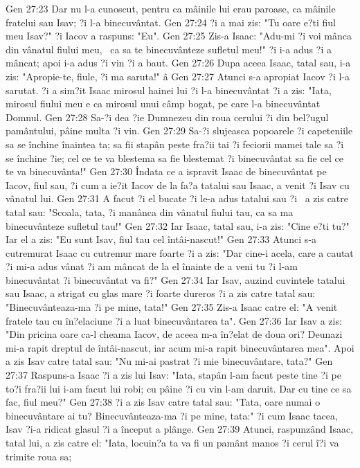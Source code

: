 Gen 27:23  Dar nu l-a cunoscut, pentru ca mâinile lui erau paroase, ca mâinile fratelui sau Isav; ?i l-a binecuvântat.
Gen 27:24  ?i a mai zis: "Tu oare e?ti fiul meu Isav?" ?i Iacov a raspuns: "Eu".
Gen 27:25  Zis-a Isaac: "Adu-mi ?i voi mânca din vânatul fiului meu,  ca sa te binecuvânteze sufletul meu!" ?i i-a adus ?i a mâncat; apoi i-a adus ?i vin ?i a baut.
Gen 27:26  Dupa aceea Isaac, tatal sau, i-a zis: "Apropie-te, fiule, ?i ma saruta!" â
Gen 27:27  Atunci s-a apropiat Iacov ?i l-a sarutat. ?i a sim?it Isaac mirosul hainei lui ?i l-a binecuvântat ?i a zis: "Iata, mirosul fiului meu e ca mirosul unui câmp bogat, pe care l-a binecuvântat Domnul.
Gen 27:28  Sa-?i dea ?ie Dumnezeu din roua cerului ?i din bel?ugul pamântului, pâine multa ?i vin.
Gen 27:29  Sa-?i slujeasca popoarele ?i capeteniile sa se închine înaintea ta; sa fii stapân peste fra?ii tai ?i feciorii mamei tale sa ?i se închine ?ie; cel ce te va blestema sa fie blestemat ?i binecuvântat sa fie cel ce te va binecuvânta!"
Gen 27:30  Îndata ce a ispravit Isaac de binecuvântat pe Iacov, fiul sau, ?i cum a ie?it Iacov de la fa?a tatalui sau Isaac, a venit ?i Isav cu vânatul lui.
Gen 27:31  A facut ?i el bucate ?i le-a adus tatalui sau ?i  a zis catre  tatal sau: "Scoala, tata, ?i manânca din vânatul fiului tau, ca sa ma binecuvânteze sufletul tau!"
Gen 27:32  Iar Isaac, tatal sau, i-a zis: "Cine e?ti tu?" Iar el a zis: "Eu sunt Isav, fiul tau cel întâi-nascut!"
Gen 27:33  Atunci s-a cutremurat Isaac cu cutremur mare foarte ?i a zis: "Dar cine-i acela, care a cautat ?i mi-a adus vânat ?i am mâncat de la el înainte de a veni tu ?i l-am binecuvântat ?i binecuvântat va fi?"
Gen 27:34  Iar Isav, auzind cuvintele tatalui sau Isaac, a strigat cu glas mare ?i foarte dureros ?i a zis catre tatal sau: "Binecuvânteaza-ma ?i pe mine, tata!"
Gen 27:35  Zis-a Isaac catre el: "A venit fratele tau cu în?elaciune ?i a luat binecuvântarea ta".
Gen 27:36  Iar Isav a zis: "Din pricina oare ca-l cheama Iacov, de aceea m-a în?elat de doua ori? Deunazi mi-a rapit dreptul de întâi-nascut, iar acum mi-a rapit binecuvântarea mea". Apoi a zis Isav catre tatal sau: "Nu mi-ai pastrat ?i mie binecuvântare, tata?"
Gen 27:37  Raspuns-a Isaac ?i a zis lui Isav: "Iata, stapân l-am facut peste tine ?i pe to?i fra?ii lui i-am facut lui robi; cu pâine ?i cu vin l-am daruit. Dar cu tine ce sa fac, fiul meu?"
Gen 27:38  ?i a zis Isav catre tatal sau: "Tata, oare numai o binecuvântare ai tu? Binecuvânteaza-ma ?i pe mine, tata:" ?i cum Isaac tacea, Isav ?i-a ridicat glasul ?i a început a plânge.
Gen 27:39  Atunci, raspunzând Isaac, tatal lui, a zis catre el: "Iata, locuin?a ta va fi un pamânt manos ?i cerul î?i va trimite roua sa;
